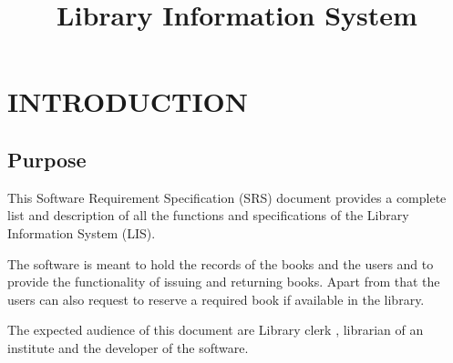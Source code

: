 \documentclass{article}
\title{Library Information System}
\author{}
\date{}
\begin{document}
\maketitle

\newpage
\hypertarget{toc}{}
\tableofcontents


\section{INTRODUCTION}

\subsection{Purpose}
This Software Requirement Specification (SRS) document provides a complete list and description of all the functions and specifications of the Library Information System (LIS).

The software is meant to hold the records of the books and the users and to provide the functionality of issuing and returning books. Apart from that the users can also request to reserve a required book if available in the library.

The expected audience of this document are Library clerk , librarian of an institute and the developer of the software.
\end{document}
